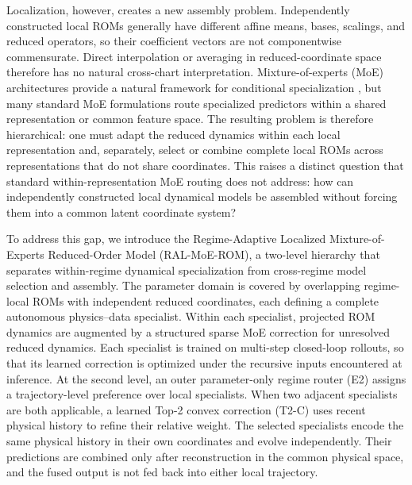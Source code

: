 Localization, however, creates a new assembly problem. Independently constructed local ROMs generally have different affine means, bases, scalings, and reduced operators, so their coefficient vectors are not componentwise commensurate. Direct interpolation or averaging in reduced-coordinate space therefore has no natural cross-chart interpretation. Mixture-of-experts (MoE) architectures provide a natural framework for conditional specialization \citep{jacobs1991,jordan1994,shazeer2017,fedus2022}, but many standard MoE formulations route specialized predictors within a shared representation or common feature space. The resulting problem is therefore hierarchical: one must adapt the reduced dynamics within each local representation and, separately, select or combine complete local ROMs across representations that do not share coordinates. This raises a distinct question that standard within-representation MoE routing does not address: how can independently constructed local dynamical models be assembled without forcing them into a common latent coordinate system?


To address this gap, we introduce the Regime-Adaptive Localized Mixture-of-Experts Reduced-Order Model (RAL-MoE-ROM), a two-level hierarchy that separates within-regime dynamical specialization from cross-regime model selection and assembly. The parameter domain is covered by overlapping regime-local ROMs with independent reduced coordinates, each defining a complete autonomous physics--data specialist. Within each specialist, projected ROM dynamics are augmented by a structured sparse MoE correction for unresolved reduced dynamics. Each specialist is trained on multi-step closed-loop rollouts, so that its learned correction is optimized under the recursive inputs encountered at inference. At the second level, an outer parameter-only regime router (E2) assigns a trajectory-level preference over local specialists. When two adjacent specialists are both applicable, a learned Top-2 convex correction (T2-C) uses recent physical history to refine their relative weight. The selected specialists encode the same physical history in their own coordinates and evolve independently. Their predictions are combined only after reconstruction in the common physical space, and the fused output is not fed back into either local trajectory.


